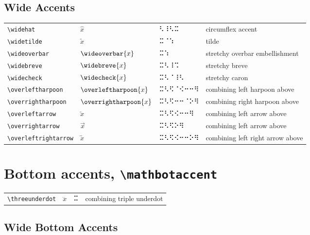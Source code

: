 \documentclass[oneside]{article}
\begin{document}
\subsection{Wide Accents}

\begin{longtable}{llll}
\verb|\widehat| & $\widehat{x}$ &  ⠣⠸⠣⠭  & {circumflex accent} \\[2ex]
\verb|\widetilde| & $\widetilde{x}$ &  ⠭⠈⠱  & {tilde} \\[2ex]
\verb|\wideoverbar| & $\wideoverbar{x}$ &  ⠭⠱  & {stretchy overbar embellishment} \\[2ex]
\verb|\widebreve| & $\widebreve{x}$ &  ⠭⠣⠸⠩  & {stretchy breve} \\[2ex]
\verb|\widecheck| & $\widecheck{x}$ &  ⠭⠣⠈⠸⠣  & {stretchy caron} \\[2ex]
\verb|\overleftharpoon| & $\overleftharpoon{x}$ &  ⠭⠣⠫⠈⠪⠒⠒⠻  & {combining left harpoon above} \\[2ex]
\verb|\overrightharpoon| & $\overrightharpoon{x}$ &  ⠭⠣⠫⠒⠒⠈⠕⠻  & {combining right harpoon above} \\[2ex]
\verb|\overleftarrow| & $\overleftarrow{x}$ &  ⠭⠣⠫⠪⠒⠒⠻  & {combining left arrow above} \\[2ex]
\verb|\overrightarrow| & $\overrightarrow{x}$ &  ⠭⠣⠫⠕⠻  & {combining left arrow above} \\[2ex]
\verb|\overleftrightarrow| & $\overleftrightarrow{x}$ &  ⠭⠣⠫⠪⠒⠒⠕⠻  & {combining left right arrow above} \\[2ex]
\end{longtable}




\section{Bottom accents, \texttt{\textbackslash{}mathbotaccent}}

\begin{longtable}{llll}
\verb|\threeunderdot| & $\threeunderdot{x}$ &  ⠭  & {combining triple underdot} \\[2ex]
\end{longtable}

\subsection{Wide Bottom Accents}
\end{document}
